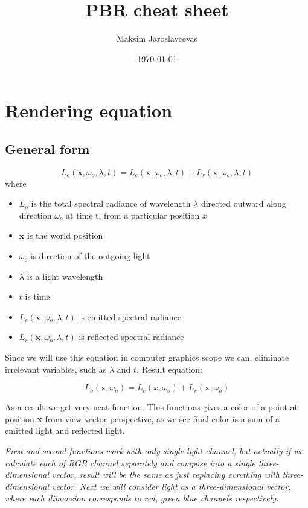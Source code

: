 \documentclass{article}
\title{PBR cheat sheet}
\author{Maksim Jaroslavcevas}
\date{\today}
\begin{document}
\maketitle
\section{Rendering equation}

\subsection{General form}
\[
L_{o}(\textbf{x}, \omega_{o}, \lambda, t) = L_{e}(\textbf{x}, \omega_{o}, \lambda, t) + L_{r}(\textbf{x}, \omega_{o}, \lambda, t)
\]
where

\begin{itemize}
    \item $L_{o}$ is the total spectral radiance of wavelength $\lambda$ directed outward along direction $\omega_{o}$ at time t, from a particular position $x$
    \item $\textbf{x}$ is the world position
    \item $\omega_{o}$ is direction of the outgoing light
    \item $\lambda$ is a light wavelength
    \item $t$ is time
    \item $L_{e}(\textbf{x}, \omega_{o}, \lambda, t)$ is emitted spectral radiance
    \item $L_{r}(\textbf{x}, \omega_{o}, \lambda, t)$ is reflected spectral radiance
\end{itemize}

Since we will use this equation in computer graphics scope we can, eliminate irrelevant 
variables, such as $\lambda$ and $t$. Result equation:

\begin{equation}
    L_{o}(\textbf{x}, \omega_{o}) = L_{e}(x, \omega_{o}) + L_{r}(\textbf{x}, \omega_{o})
\end{equation}

As a result we get very neat function. This functions gives a color of a point at position \textbf{x} 
from view vector perspective, as we see final color is a sum of a emitted light and reflected light.

\textit{First and second functions work with only single light channel, 
but actually if we calculate each of RGB channel separately and compose 
into a single three-dimensional vector, result will be the same as just 
replacing evrething with three-dimensional vector. Next we will consider 
light as a three-dimensional vector, where each dimension corresponds to
red, green blue channels respectively.}
\end{document}
